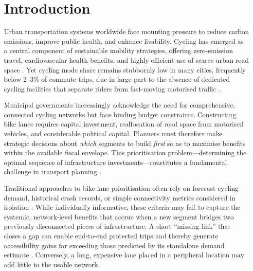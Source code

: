 \documentclass[12pt,a4paper]{article}
\begin{document}
\newpage

\section{Introduction}
\label{sec:introduction}

Urban transportation systems worldwide face mounting pressure to reduce carbon emissions, improve public health, and enhance livability. Cycling has emerged as a central component of sustainable mobility strategies, offering zero-emission travel, cardiovascular health benefits, and highly efficient use of scarce urban road space \citep{pucher2017cycling,heinen2010commuter}. Yet cycling mode share remains stubbornly low in many cities, frequently below 2--3\% of commute trips, due in large part to the absence of dedicated cycling facilities that separate riders from fast-moving motorised traffic \citep{dill2003bicycle,buehler2012cycling}.

Municipal governments increasingly acknowledge the need for comprehensive, connected cycling networks but face binding budget constraints. Constructing bike lanes requires capital investment, reallocation of road space from motorised vehicles, and considerable political capital. Planners must therefore make strategic decisions about \emph{which} segments to build \emph{first} so as to maximise benefits within the available fiscal envelope. This prioritisation problem---determining the optimal sequence of infrastructure investments---constitutes a fundamental challenge in transport planning \citep{krizek2009guidelines,schoner2014missing}.

Traditional approaches to bike lane prioritisation often rely on forecast cycling demand, historical crash records, or simple connectivity metrics considered in isolation \citep{larsen2013build}. While individually informative, these criteria may fail to capture the systemic, network-level benefits that accrue when a new segment bridges two previously disconnected pieces of infrastructure. A short ``missing link'' that closes a gap can enable end-to-end protected trips and thereby generate accessibility gains far exceeding those predicted by its standalone demand estimate \citep{lowry2016using,furth2016network}. Conversely, a long, expensive lane placed in a peripheral location may add little to the usable network.
\end{document}
